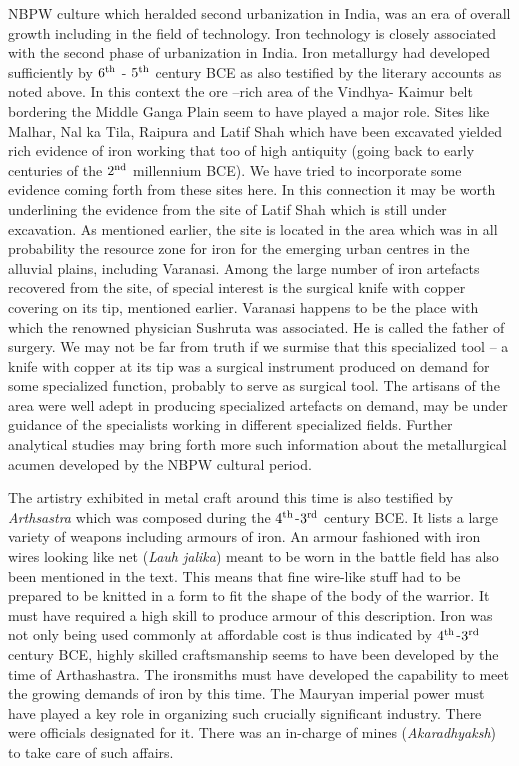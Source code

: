 NBPW culture which heralded second urbanization in India, was an era of overall growth including in the field of technology. Iron technology is closely associated with the second phase of urbanization in India. Iron metallurgy had developed sufficiently by $6^{\rm th}$ - $5^{\rm th}$ century BCE as also testified by the literary accounts as noted above. In this context the ore –rich area of the Vindhya- Kaimur belt bordering the Middle Ganga Plain seem to have played a major role. Sites like Malhar, Nal ka Tila, Raipura and Latif Shah which have been excavated yielded rich evidence of iron working that too of high antiquity (going back to early centuries of the $2^{\rm nd}$ millennium BCE). We have tried to incorporate some evidence coming forth from these sites here. In this connection it may be worth underlining the evidence from the site of Latif Shah which is still under excavation.  As mentioned earlier, the site is located in the area which was in all probability the resource zone for iron for the emerging urban centres in the alluvial plains, including Varanasi.  Among the large number of iron artefacts recovered from the site, of special interest is the surgical knife with copper covering on its tip, mentioned earlier. Varanasi happens to be the place with which the renowned physician Sushruta was associated. He is called the father of surgery. We may not be far from truth if we surmise that this specialized tool – a knife with copper at its tip was a surgical instrument produced on demand for some specialized function, probably to serve as surgical tool. The artisans of the area were well adept in producing specialized artefacts on demand, may be under guidance of the specialists working in different specialized fields. Further analytical studies may bring forth more such information about the metallurgical acumen developed by the NBPW cultural period.

The artistry exhibited in metal craft around this time is also testified by {\it Arthsastra} which was composed during the $4^{\rm th}$-$3^{\rm rd}$ century BCE. It lists a large variety of weapons including armours of iron. An armour fashioned with iron wires looking like net ({\it Lauh jalika}) meant to be worn in the battle field has also been mentioned in the text. This means that fine wire-like stuff had to be prepared to be knitted in a form to fit the shape of the body of the warrior. It must have required a high skill to produce armour of this description. Iron was not only being used commonly at affordable cost is thus indicated by $4^{\rm th}$-$3^{\rm rd}$ century BCE, highly skilled craftsmanship seems to have been developed by the time of Arthashastra. The ironsmiths must have developed the capability to meet the growing demands of iron by this time. The Mauryan imperial power must have played a key role in organizing such crucially significant industry. There were officials designated for it. There was an in-charge of mines ({\it Akaradhyaksh}) to take care of such affairs.

